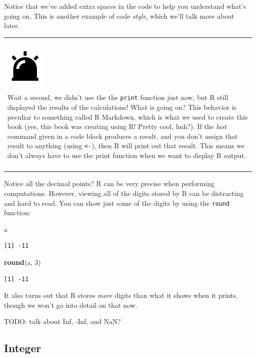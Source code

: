 \documentclass[
]{book}
\newenvironment{Shaded}{\begin{snugshade}}{\end{snugshade}}
\newcommand{\DecValTok}[1]{\textcolor[rgb]{0.00,0.00,0.81}{#1}}
\newcommand{\KeywordTok}[1]{\textcolor[rgb]{0.13,0.29,0.53}{\textbf{#1}}}
\newcommand{\NormalTok}[1]{#1}
\newenvironment{caution}
{
  \begin{center}
  \begin{tabular}{|>{\columncolor{caution}}p{0.9\textwidth}|}
  \hline\\
  \includegraphics[scale=0.1]{src/images/alarm-warning-fill.png}
}
{\\\\\hline
  \end{tabular}
  \end{center}
}
\begin{document}
Notice that we've added extra spaces in the code to help you understand what's going on.
This is another example of code \emph{style}, which we'll talk more about later.

\begin{caution}
Wait a second, we didn't use the the \texttt{print} function just now,
but R still displayed the results of the calculations! What is going on?
This behavior is peculiar to something called R Markdown, which is what
we used to create this book (yes, this book was creating using R! Pretty
cool, huh?). If the \emph{last} command given in a code block produces a
result, and you don't assign that result to anything (using
\texttt{\textless{}-}), then R will print out that result. This means we
don't always have to use the print function when we want to display R
output.
\end{caution}

Notice all the decimal points?
R can be very precise when performing computations.
However, viewing all of the digits stored by R can be distracting and hard to read.
You can show just some of the digits by using the \texttt{round} function:

\begin{Shaded}
\begin{Highlighting}[]
\NormalTok{a}
\end{Highlighting}
\end{Shaded}

\begin{verbatim}
[1] -11
\end{verbatim}

\begin{Shaded}
\begin{Highlighting}[]
\KeywordTok{round}\NormalTok{(a, }\DecValTok{3}\NormalTok{)}
\end{Highlighting}
\end{Shaded}

\begin{verbatim}
[1] -11
\end{verbatim}

It also turns out that R stores \emph{more} digits than what it shows when it prints, though we won't go into detail on that now.

TODO: talk about Inf, -Inf, and NaN?

\hypertarget{integer}{%
\subsection{Integer}\label{integer}}
\end{document}
